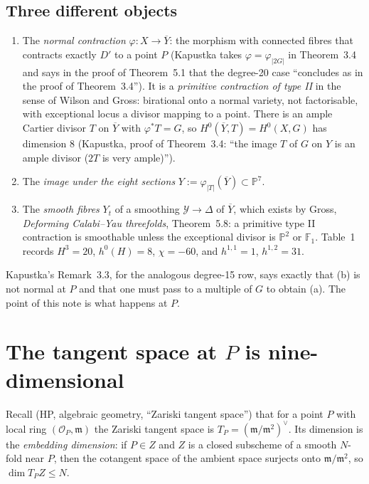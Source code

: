 \documentclass[10pt,a4paper]{article}
\theoremstyle{plain}
\theoremstyle{definition}
\theoremstyle{remark}
\begin{document}
\subsection*{Three different objects}
\begin{enumerate}[label=(\alph*)]
\item The \emph{normal contraction} $\varphi:X\to\overline{Y}$: the
morphism with connected fibres that contracts exactly $D'$ to a
point $P$ (Kapustka takes $\varphi=\varphi_{|2G|}$ in Theorem~3.4
and says in the proof of Theorem~5.1 that the degree-20 case
``concludes as in the proof of Theorem~3.4''). It is a
\emph{primitive contraction of type II} in the sense of Wilson and
Gross: birational onto a normal variety, not factorisable, with
exceptional locus a divisor mapping to a point. There is an ample
Cartier divisor $T$ on $\overline{Y}$ with $\varphi^*T=G$, so
$H^0(\overline{Y},T)=H^0(X,G)$ has dimension $8$
(Kapustka, proof of Theorem~3.4: ``the image $T$ of $G$ on $Y$
is an ample divisor ($2T$ is very ample)'').
\item The \emph{image under the eight sections}
$Y:=\varphi_{|T|}(\overline{Y})\subset\mathbb{P}^7$.
\item The \emph{smooth fibres} $Y_t$ of a smoothing
$\mathcal{Y}\to\Delta$ of $\overline{Y}$, which exists by Gross,
\emph{Deforming Calabi--Yau threefolds}, Theorem~5.8: a primitive
type II contraction is smoothable unless the exceptional divisor is
$\mathbb{P}^2$ or $\mathbb{F}_1$. Table~1 records
$H^3=20$, $h^0(H)=8$, $\chi=-60$, and $h^{1,1}=1$, $h^{1,2}=31$.
\end{enumerate}
Kapustka's Remark~3.3, for the analogous degree-15 row, says
exactly that (b) is not normal at $P$ and that one must pass to a
multiple of $G$ to obtain (a). The point of this note is what
happens at $P$.

\section{The tangent space at $P$ is nine-dimensional}

Recall (HP, algebraic geometry, ``Zariski tangent space'') that for
a point $P$ with local ring $(\mathcal{O}_P,\mathfrak{m})$ the
Zariski tangent space is $T_P=(\mathfrak{m}/\mathfrak{m}^2)^\vee$.
Its dimension is the \emph{embedding dimension}: if $P\in Z$ and
$Z$ is a closed subscheme of a smooth $N$-fold near $P$, then the
cotangent space of the ambient space surjects onto
$\mathfrak{m}/\mathfrak{m}^2$, so $\dim T_PZ\le N$.
\end{document}
